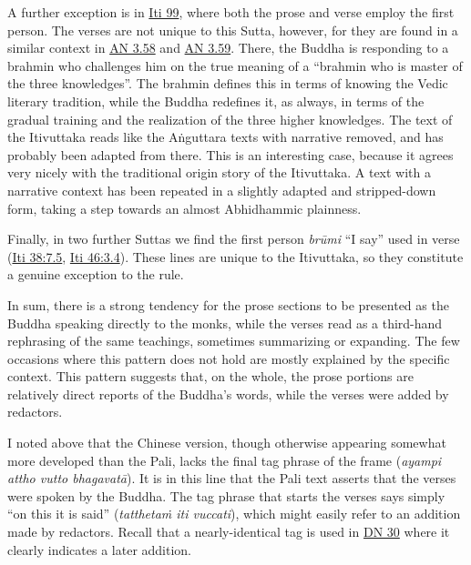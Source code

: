 \documentclass[12pt,openany]{book}%
\begin{document}
A further exception is in \href{https://suttacentral.net/iti99/en/sujato}{Iti 99}, where both the prose and verse employ the first person. The verses are not unique to this Sutta, however, for they are found in a similar context in \href{https://suttacentral.net/an3.58/en/sujato}{AN 3.58} and \href{https://suttacentral.net/an3.59/en/sujato}{AN 3.59}. There, the Buddha is responding to a brahmin who challenges him on the true meaning of a “brahmin who is master of the three knowledges”. The brahmin defines this in terms of knowing the Vedic literary tradition, while the Buddha redefines it, as always, in terms of the gradual training and the realization of the three higher knowledges. The text of the Itivuttaka reads like the \textsanskrit{Aṅguttara} texts with narrative removed, and has probably been adapted from there. This is an interesting case, because it agrees very nicely with the traditional origin story of the Itivuttaka. A text with a narrative context has been repeated in a slightly adapted and stripped-down form, taking a step towards an almost Abhidhammic plainness.

Finally, in two further Suttas we find the first person \emph{\textsanskrit{brūmi}} “I say” used in verse (\href{https://suttacentral.net/iti38/en/sujato\#7.5}{Iti 38:7.5}, \href{https://suttacentral.net/iti46/en/sujato\#3.4}{Iti 46:3.4}). These lines are unique to the Itivuttaka, so they constitute a genuine exception to the rule.

In sum, there is a strong tendency for the prose sections to be presented as the Buddha speaking directly to the monks, while the verses read as a third-hand rephrasing of the same teachings, sometimes summarizing or expanding. The few occasions where this pattern does not hold are mostly explained by the specific context. This pattern suggests that, on the whole, the prose portions are relatively direct reports of the Buddha’s words, while the verses were added by redactors.

I noted above that the Chinese version, though otherwise appearing somewhat more developed than the Pali, lacks the final tag phrase of the frame (\emph{ayampi attho vutto \textsanskrit{bhagavatā}}). It is in this line that the Pali text asserts that the verses were spoken by the Buddha. The tag phrase that starts the verses says simply “on this it is said” (\emph{\textsanskrit{tatthetaṁ} iti vuccati}), which might easily refer to an addition made by redactors. Recall that a nearly-identical tag is used in \href{https://suttacentral.net/dn30/en/sujato}{DN 30} where it clearly indicates a later addition.
\end{document}
